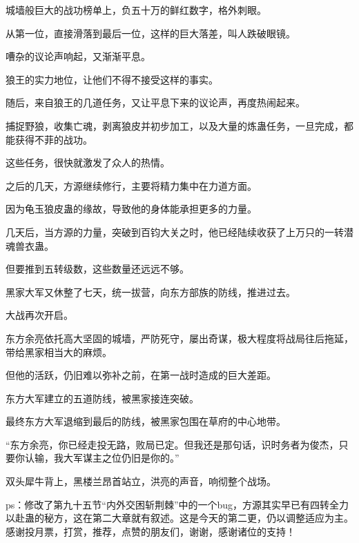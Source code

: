 \begin{this_body}
城墙般巨大的战功榜单上，负五十万的鲜红数字，格外刺眼。

从第一位，直接滑落到最后一位，这样的巨大落差，叫人跌破眼镜。

嘈杂的议论声响起，又渐渐平息。

狼王的实力地位，让他们不得不接受这样的事实。

随后，来自狼王的几道任务，又让平息下来的议论声，再度热闹起来。

捕捉野狼，收集亡魂，剥离狼皮并初步加工，以及大量的炼蛊任务，一旦完成，都能获得不菲的战功。

这些任务，很快就激发了众人的热情。

之后的几天，方源继续修行，主要将精力集中在力道方面。

因为龟玉狼皮蛊的缘故，导致他的身体能承担更多的力量。

几天后，当方源的力量，突破到百钧大关之时，他已经陆续收获了上万只的一转潜魂兽衣蛊。

但要推到五转级数，这些数量还远远不够。

黑家大军又休整了七天，统一拔营，向东方部族的防线，推进过去。

大战再次开启。

东方余亮依托高大坚固的城墙，严防死守，屡出奇谋，极大程度将战局往后拖延，带给黑家相当大的麻烦。

但他的活跃，仍旧难以弥补之前，在第一战时造成的巨大差距。

东方大军建立的五道防线，被黑家接连突破。

最终东方大军退缩到最后的防线，被黑家包围在草府的中心地带。

“东方余亮，你已经走投无路，败局已定。但我还是那句话，识时务者为俊杰，只要你认输，我大军谋主之位仍旧是你的。”

双头犀牛背上，黑楼兰昂首站立，洪亮的声音，响彻整个战场。

ps：修改了第九十五节“内外交困斩荆棘”中的一个bug，方源其实早已有四转全力以赴蛊的秘方，这在第二大章就有叙述。这是今天的第二更，仍以调整适应为主。感谢投月票，打赏，推荐，点赞的朋友们，谢谢，感谢诸位的支持！

\end{this_body}

